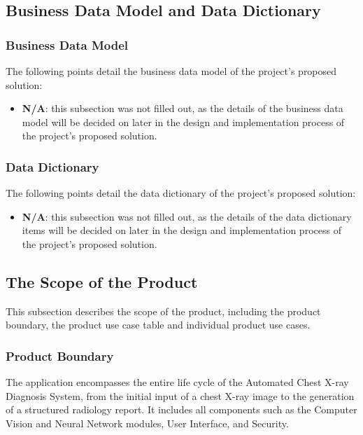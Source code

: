 \documentclass[12pt]{article}
\begin{document}
\subsection{Business Data Model and Data Dictionary}
\subsubsection{Business Data Model}
The following points detail the business data model of the project's proposed solution:
\begin{itemize}
    \item \textbf{N/A}: this subsection was not filled out, as the details of the business data model will be decided on later in the design and implementation process of the project's proposed solution.
\end{itemize}

\subsubsection{Data Dictionary}
The following points detail the data dictionary of the project's proposed solution:
\begin{itemize}
    \item \textbf{N/A}: this subsection was not filled out, as the details of the data dictionary items will be decided on later in the design and implementation process of the project's proposed solution.
\end{itemize}

\subsection{The Scope of the Product}
This subsection describes the scope of the product, including the product boundary, the product use case table and individual product use cases.

\subsubsection{Product Boundary}
The application encompasses the entire life cycle of the Automated Chest X-ray Diagnosis System, from the initial input of a chest X-ray image to the generation of a structured radiology report. It includes all components such as the Computer Vision and Neural Network modules, User Interface, and Security. 
\end{document}
